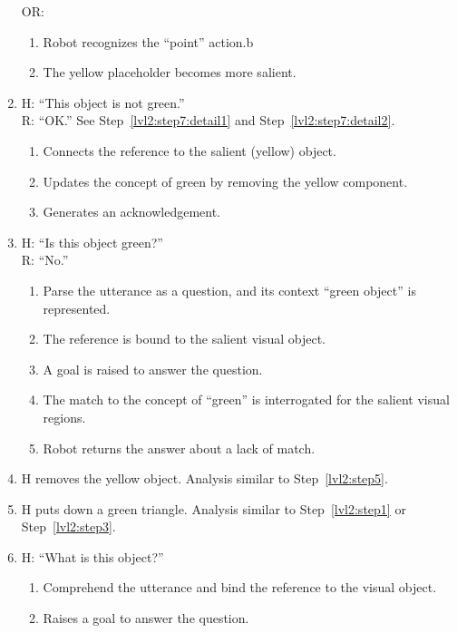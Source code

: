 \documentclass{article}
\begin{document}
\begin{enumerate}
  OR:
  \begin{enumerate}
  \item \label{lvl2:step8b:detail1} Robot recognizes the ``point''
    action.b
  \item \label{lvl2:step8b:detail2} The yellow placeholder becomes
    more salient.
  \end{enumerate}

\item \label{lvl2:step9}
  H: ``This object is not green.''\\
  R: ``OK.''
  See Step~\ref{lvl2:step7:detail1} and Step~\ref{lvl2:step7:detail2}.
  \begin{enumerate}
  \item \label{lvl2:step9:detail1} Connects the reference to the
    salient (yellow) object.
  \item \label{lvl2:step9:detail2} Updates the concept of green by
    removing the yellow component.
  \item \label{lvl2:step9:detail3} Generates an acknowledgement.
  \end{enumerate} 

\item \label{lvl2:step10}
  H: ``Is this object green?''\\
  R: ``No.''
  \begin{enumerate}
  \item \label{lvl2:step10:detail1} Parse the utterance as a question,
    and its context ``green object'' is represented.
  \item \label{lvl2:step10:detail2} The reference is bound to the
    salient visual object.
  \item \label{lvl2:step10:detail3} A goal is raised to answer the
    question.
  \item \label{lvl2:step10:detail4} The match to the concept of
    ``green'' is interrogated for the salient visual regions.
  \item \label{lvl2:step10:detail5} Robot returns the answer about a
    lack of match.
  \end{enumerate}

\item \label{lvl2:step11}
  H removes the yellow object.
  Analysis similar to Step~\ref{lvl2:step5}.

\item \label{lvl2:step12}
  H puts down a green triangle.
  Analysis similar to Step~\ref{lvl2:step1} or Step~\ref{lvl2:step3}.

\item \label{lvl2:step13}
  H: ``What is this object?''
  \begin{enumerate}
  \item \label{lvl2:step13:detail1} Comprehend the utterance and bind
    the reference to the visual object.
  \item \label{lvl2:step13:detail2} Raises a goal to answer the
    question.
  \end{enumerate}


\end{enumerate}
\end{document}
